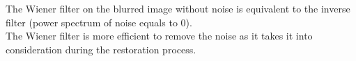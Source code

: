 \bigskip
The Wiener filter on the blurred image without noise is equivalent to the inverse filter (power spectrum of noise equals to 0). \\
The Wiener filter is more efficient to remove the noise as it takes it into consideration
during the restoration process.
